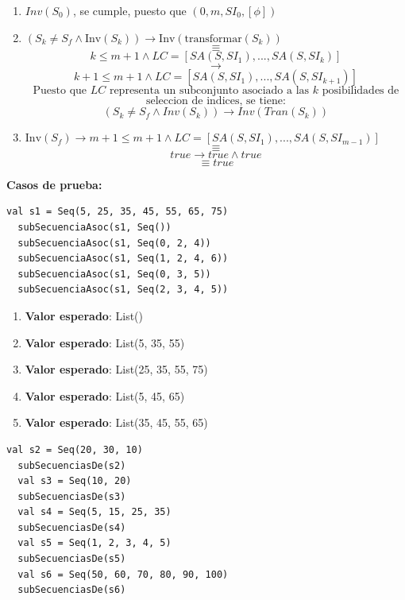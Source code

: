 \documentclass[12pt, a4paper]{article}
\begin{document}
  \begin{enumerate}
    \item $Inv(S_0)$, se cumple, puesto que $(0,m,SI_0,[\phi])$ 
    \item \( (S_k \neq S_f \land \text{Inv}(S_k)) \rightarrow \text{Inv}(\text{transformar}(S_k)) \)
    \[\equiv\]
    \[k \leq m+1 \land LC  =[SA(S,SI_1),...,SA(S,SI_{k})]\] 
    \[\rightarrow   \]
    \[k+1\leq m+1 \land LC =[SA(S,SI_1),...,SA(S,SI_{k+1})]\]
    \[ \text{Puesto que $LC$ representa un subconjunto asociado a las $k$ posibilidades de}\]
    \[ \text{seleccion de indices, se tiene:}\]
    \[ (S_k \neq S_f \land Inv(S_k)) \rightarrow Inv(Tran(S_k))\]
    \item \( \text{Inv}(S_f) \rightarrow m+1 \leq m+1 \land LC = [SA(S,SI_1),...,SA(S,SI_{m-1})]\)
    \[ \equiv\]
    \[ true  \rightarrow true \land true\] 
    \[\equiv true\]
\end{enumerate}
\textbf{Casos de prueba: \\}
\begin{lstlisting}[caption=Casos de prueba para la función subSecuenciaAsoc, label=lst:scala_code]
  val s1 = Seq(5, 25, 35, 45, 55, 65, 75)
  subSecuenciaAsoc(s1, Seq())
  subSecuenciaAsoc(s1, Seq(0, 2, 4))
  subSecuenciaAsoc(s1, Seq(1, 2, 4, 6))
  subSecuenciaAsoc(s1, Seq(0, 3, 5))
  subSecuenciaAsoc(s1, Seq(2, 3, 4, 5))
\end{lstlisting}
\begin{enumerate}
  \item \textbf{Valor esperado}: List()
  \item \textbf{Valor esperado}: List(5, 35, 55)
  \item \textbf{Valor esperado}: List(25, 35, 55, 75)
  \item \textbf{Valor esperado}: List(5, 45, 65)
  \item \textbf{Valor esperado}: List(35, 45, 55, 65)
\end{enumerate}
\begin{lstlisting}[caption=Casos de prueba para la función subSecuenciasDe, label=lst:scala_code]
  val s2 = Seq(20, 30, 10)
  subSecuenciasDe(s2)  
  val s3 = Seq(10, 20)
  subSecuenciasDe(s3)  
  val s4 = Seq(5, 15, 25, 35)
  subSecuenciasDe(s4)  
  val s5 = Seq(1, 2, 3, 4, 5)
  subSecuenciasDe(s5)  
  val s6 = Seq(50, 60, 70, 80, 90, 100)
  subSecuenciasDe(s6)  
\end{lstlisting}
\end{document}
